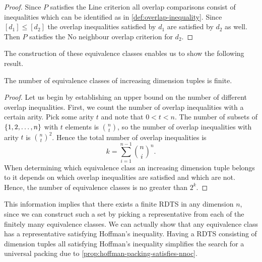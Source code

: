 \begin{proof}
Since $P$ satisfies the Line criterion  all overlap comparisons consist of inequalities which can be identified as in \cref{def:overlap-inequality}. Since $[d_1] \leq [d_2]$ the overlap inequalities satisfied by $d_1$ are satisfied by $d_2$ as well. Then $P$ satisfies the No neighbour overlap criterion  for $d_2$.
\end{proof}

\noindent The construction of these equivalence classes enables us to show the following result.

\begin{proposition}
The number of equivalence classes of increasing dimension tuples is finite.
\end{proposition}
\begin{proof}
Let us begin by establishing an upper bound on the number of different overlap inequalities. First, we count the number of overlap inequalities with a certain arity. Pick some arity $t$ and note that $0 < t < n$. The number of subsets of $\left\{ 1, 2, \dotsc, n \right\}$ with $t$ elements is $\binom{n}{t}$, so the number of overlap inequalities with arity $t$ is $\binom{n}{t}^2$. Hence the total number of overlap inequalities is
\[
k = \sum_{i = 1}^{n - 1} \binom{n}{i}^n.
\]
When determining which equivalence class an increasing dimension tuple belongs to it depends on which overlap inequalities are satisfied and which are not. Hence, the number of equivalence classes is no greater than $2^k$.
\end{proof}

\noindent This information implies that there exists a finite RDTS in any dimension $n$, since we can construct such a set by picking a representative from each of the finitely many equivalence classes. We can actually show that any equivalence class has a representative satisfying Hoffman's inequality. Having a RDTS consisting of dimension tuples all satisfying Hoffman's inequality simplifies the search for a universal packing due to \cref{prop:hoffman-packing-satisfies-nnoc}.

